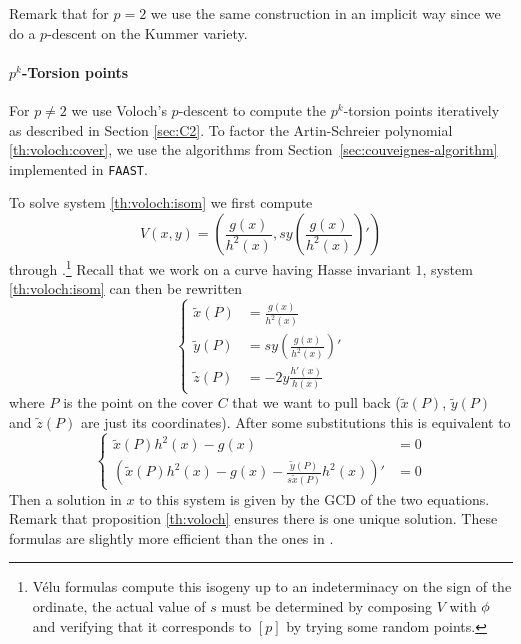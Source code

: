   Remark that
for $p=2$ we use the same construction in an implicit way since we do
a $p$-descent on the Kummer variety.


\paragraph{$p^k$-Torsion points}
For $p\ne2$ we use Voloch's $p$-descent to compute the $p^k$-torsion
points iteratively as described in Section \ref{sec:C2}. To factor the
Artin-Schreier polynomial \eqref{th:voloch:cover}, we use the
algorithms from Section~\ref{sec:couveignes-algorithm} implemented in
\texttt{FAAST}.

To solve system \eqref{th:voloch:isom} we first compute
\begin{equation*}
  V(x,y) = \left(\frac{g(x)}{h^2(x)}, 
    sy\left(\frac{g(x)}{h^2(x)}\right)'\right)
\end{equation*}
through .\footnote{Vélu formulas compute
  this isogeny up to an indeterminacy on the sign of the ordinate, the
  actual value of $s$ must be determined by composing $V$ with
  $\phi$ and verifying that it corresponds to $[p]$ by trying
  some random points.} Recall that we work on a curve having Hasse
invariant $1$, system \eqref{th:voloch:isom} can then be rewritten
\begin{equation*}
  \left\{
    \begin{aligned}
      \tilde{x}(P) &= \frac{g(x)}{h^2(x)}\\
      \tilde{y}(P) &= sy\left(\frac{g(x)}{h^2(x)}\right)'\\
      \tilde{z}(P) &= -2y\frac{h'(x)}{h(x)}
    \end{aligned}
  \right.
\end{equation*}
where $P$ is the point on the cover $C$ that we want to pull back
($\tilde{x}(P)$, $\tilde{y}(P)$ and $\tilde{z}(P)$ are just its
coordinates). After some substitutions this is equivalent to
\begin{equation*}
  \left\{
    \begin{aligned}
      \tilde{x}(P)h^2(x) - g(x) &= 0\\
      \left(\tilde{x}(P)h^2(x) - g(x) - \frac{\tilde{y}(P)}{s\tilde{x}(P)}h^2(x)\right)' &= 0
    \end{aligned}
  \right.
\end{equation*}
Then a solution in $x$ to this system is given by the GCD of the two
equations. Remark that proposition \ref{th:voloch} ensures there is
one unique solution. These formulas are slightly more efficient than
the ones in \cite[$\S$6.2]{lercier-algorithmique}.

